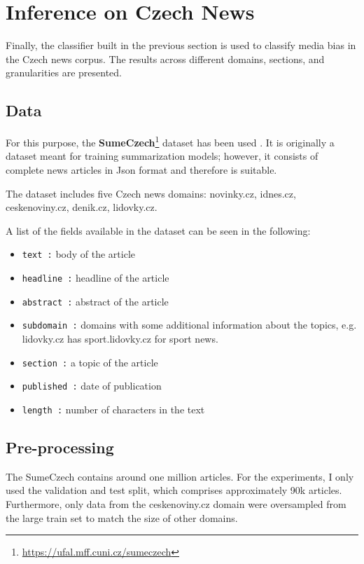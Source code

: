 \chapter{Inference on Czech News}\label{inference}
Finally, the classifier built in the previous section is used to classify media bias in the Czech news corpus. The results across different domains, sections, and granularities are presented.



\section{Data}
For this purpose, the \textbf{SumeCzech}\footnote{\url{https://ufal.mff.cuni.cz/sumeczech}} dataset has been used \cite{straka2018sumeczech}. It is originally a dataset meant for training summarization models; however, it consists of complete news articles in Json format and therefore is suitable.

The dataset includes five Czech news domains: novinky.cz, idnes.cz, ceskenoviny.cz, denik.cz, lidovky.cz. 

A list of the fields available in the dataset can be seen in the following:
\begin{itemize}
    \item \verb|text :| body of the article
    \item \verb|headline :| headline of the article
    \item \verb|abstract :|  abstract of the article
    \item \verb|subdomain :| domains with some additional information about the topics, e.g. lidovky.cz has sport.lidovky.cz for sport news.
    \item \verb|section :| a topic of the article
    \item \verb|published :| date of publication
    \item \verb|length :| number of characters in the text
\end{itemize}



\section{Pre-processing}
The SumeCzech contains around one million articles. For the experiments, I only used the validation and test split, which comprises approximately 90k articles. Furthermore, only data from the ceskenoviny.cz domain were oversampled from the large train set to match the size of other domains.

